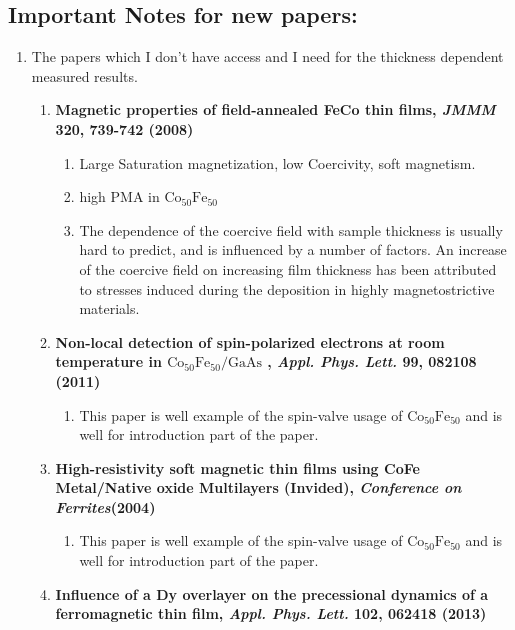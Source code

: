 \subsection{Important Notes for new papers:}
\begin{enumerate}
    \item The papers which I don't have access and I need for the thickness dependent measured results.
    \begin{enumerate}[(1.)]
        \item \textbf{Magnetic properties of field-annealed FeCo thin films, \textit{JMMM} 320, 739-742 (2008)}
        \begin{enumerate}[\ding{217}]
            \item Large Saturation magnetization, low Coercivity, soft magnetism.
            \item high PMA in $\mathrm{Co_{50}Fe_{50}}$
            \item The dependence of the coercive field with sample thickness is usually hard to predict, and is influenced by a number of factors. An increase of the coercive field on increasing film thickness has been attributed to stresses induced during the deposition in highly magnetostrictive materials.
        \end{enumerate}
        \item \textbf{Non-local detection of spin-polarized electrons at room temperature in $\mathrm{Co_{50}Fe_{50}/GaAs}$ , \textit{Appl. Phys. Lett. } 99, 082108 (2011)}
        \begin{enumerate}[\ding{217}]
            \item This paper is well example of the spin-valve usage of $\mathrm{Co_{50}Fe_{50}}$ and is well for introduction part of the paper.
        \end{enumerate}
        \item \textbf{High-resistivity soft magnetic thin films using CoFe Metal/Native oxide Multilayers (Invided), \textit{Conference on Ferrites}(2004)}
        \begin{enumerate}[\ding{217}]
            \item This paper is well example of the spin-valve usage of $\mathrm{Co_{50}Fe_{50}}$ and is well for introduction part of the paper.
        \end{enumerate}
        \item \textbf{Influence of a Dy overlayer on the precessional dynamics of a ferromagnetic thin film, \textit{Appl. Phys. Lett. } 102, 062418 (2013)}
        \begin{enumerate}[\ding{217}]

\end{enumerate}
\end{enumerate}
\end{enumerate}
